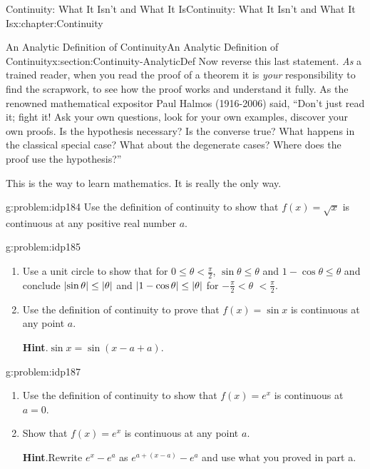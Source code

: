 \begin{chapterptx}{Continuity: What It Isn't and What It Is}{}{Continuity: What It Isn't and What It Is}{}{}{x:chapter:Continuity}
\begin{sectionptx}{An Analytic Definition of Continuity}{}{An Analytic Definition of Continuity}{}{}{x:section:Continuity-AnalyticDef}
		Now reverse this last statement.  \emph{As} a trained reader, when you read the proof of a theorem it is \emph{your} responsibility to find the scrapwork, to see how the proof works and understand it fully.  As the renowned mathematical expositor Paul Halmos  (1916-2006) said, ``Don't just read it; fight it! Ask your own questions, look for your own examples, discover your own proofs. Is the hypothesis necessary? Is the converse true? What happens in the classical special case? What about the degenerate cases? Where does the proof use the hypothesis?''%
		\par
		This is the way to learn mathematics.  It is really the only way.%
		\begin{problem}{}{g:problem:idp184}%
			Use the definition of continuity to show that \(f(x)=\sqrt{x}\) is continuous at any positive real number \(a\).%
		\end{problem}
		\begin{problem}{}{g:problem:idp185}%
			\begin{enumerate}[font=\bfseries,label=(\alph*),ref=\alph*]
				\item{}Use a unit circle to show that for \(0\leq\theta\lt
				\frac{\pi}{2}\), \(\sin \theta\leq\theta\) and \(1-\cos \theta\leq\theta\) and conclude \(\left|\sin
					\theta\right|\leq\left|\theta\right|\) and \(\left|1-\cos
					\theta\right|\leq\left|\theta\right|\) for \(-\frac{\pi}{2}\lt
				\theta\) \(\lt \frac{\pi}{2}\).%
				\item{}Use the definition of continuity to prove that \(f(x)=\sin x\) is continuous at any point \(a\).%
				\par\smallskip%
				\noindent\textbf{\blocktitlefont Hint}.\hypertarget{g:hint:idp186}{}\quad{}\(\sin x=\sin\left(x-a+a\right)\).%
			\end{enumerate}
		\end{problem}
		\begin{problem}{}{g:problem:idp187}%
			\begin{enumerate}[font=\bfseries,label=(\alph*),ref=\alph*]
				\item{}Use the definition of continuity to show that \(f(x)=e^x\) is continuous at \(a=0\).%
				\item{}Show that \(f(x)=e^x\) is continuous at any point \(a\).%
				\par\smallskip%
				\noindent\textbf{\blocktitlefont Hint}.\hypertarget{g:hint:idp188}{}\quad{}Rewrite \(e^x-e^a\) as \(e^{a+(x-a)}-e^a\) and use what you proved in part a.%
			\end{enumerate}

\end{problem}
\end{sectionptx}
\end{chapterptx}
